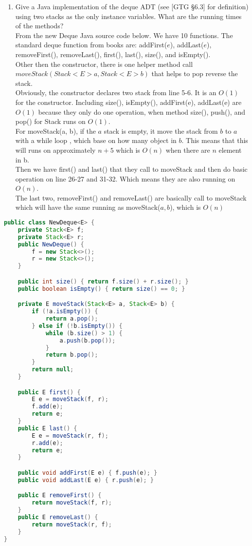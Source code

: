 \documentclass[12pt, a4paper, twoside]{article}
\begin{document}
\begin{enumerate}
	\item Give a Java implementation of the deque ADT (see [GTG \S 6.3] for definition) using two stacks as the only instance variables. What are the running times of the methods?\\
	From the new Deque Java source code below. We have 10 functions. The standard deque function from books are:
	addFirst($e$), addLast($e$), removeFirst(), removeLast(), first(), last(), size(), and isEmpty().\\

	Other then the constructor, there is one helper method call $moveStack(Stack<E> a, Stack<E> b)$ that helps to pop reverse the stack.\\

	Obviously, the constructor declares two stack from line 5-6. It is an $O(1)$ for the constructor.
	Including size(), isEmpty(), addFirst(e), addLast(e) are $O(1)$  because they only do one operation, when method size(), push(), and pop() for Stack runs on $O(1)$.\\

	For moveStack(a, b), if the $a$ stack is empty, it move the stack from $b$ to $a$ with a while loop , which base on how many object in $b$. This means that this will runs on approximately $n+5$ which is $O(n)$ when there are $n$ element in b.\\

	Then we have first() and last() that they call to moveStack and then do basic operation on line 26-27 and 31-32. Which means they are also running on $O(n)$.\\

	The last two, removeFirst() and removeLast() are basically call to moveStack which will have the same running as moveStack($a, b$), which is $O(n)$

    \pagebreak
\end{enumerate}
\begin{lstlisting}[language=Java]
public class NewDeque<E> {
    private Stack<E> f;
    private Stack<E> r;
    public NewDeque() {
        f = new Stack<>();
        r = new Stack<>();
    }

    public int size() { return f.size() + r.size(); }
    public boolean isEmpty() { return size() == 0; }

    private E moveStack(Stack<E> a, Stack<E> b) {
        if (!a.isEmpty()) {
            return a.pop();
        } else if (!b.isEmpty()) {
            while (b.size() > 1) {
                a.push(b.pop());
            }
            return b.pop();
        }
        return null;
    }

    public E first() {
        E e = moveStack(f, r);
        f.add(e);
        return e;
    }
    public E last() {
        E e = moveStack(r, f);
        r.add(e);
        return e;
    }

    public void addFirst(E e) { f.push(e); }
    public void addLast(E e) { r.push(e); }

    public E removeFirst() {
        return moveStack(f, r);
    }
    public E removeLast() {
        return moveStack(r, f);
    }
}
\end{lstlisting}
\end{document}

